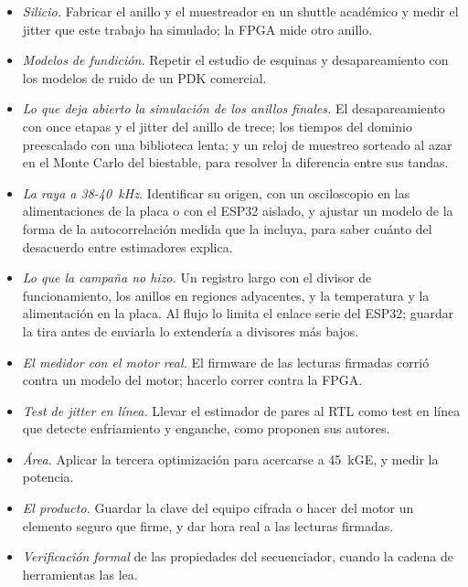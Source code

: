 \begin{itemize}
\item \emph{Silicio.} Fabricar el anillo y el muestreador en un shuttle
académico y medir el jitter que este trabajo ha simulado; la \ac{FPGA}
mide otro anillo.
\item \emph{Modelos de fundición.} Repetir el estudio de esquinas y
desapareamiento con los modelos de ruido de un \ac{PDK} comercial.
\item \emph{Lo que deja abierto la simulación de los anillos finales.} El
desapareamiento con once etapas y el jitter del anillo de trece; los
tiempos del dominio preescalado con una biblioteca lenta; y un reloj de
muestreo sorteado al azar en el Monte Carlo del biestable, para resolver
la diferencia entre sus tandas.
\item \emph{La raya a 38-40~kHz.} Identificar su origen, con un
osciloscopio en las alimentaciones de la placa o con el ESP32 aislado, y
ajustar un modelo de la forma de la autocorrelación medida que la
incluya, para saber cuánto del desacuerdo entre estimadores explica.
\item \emph{Lo que la campaña no hizo.} Un registro largo con el divisor
de funcionamiento, los anillos en regiones adyacentes, y la temperatura y
la alimentación en la placa. Al flujo lo limita el enlace serie del
ESP32; guardar la tira antes de enviarla lo extendería a divisores más
bajos.
\item \emph{El medidor con el motor real.} El firmware de las lecturas
firmadas corrió contra un modelo del motor; hacerlo correr contra la
\ac{FPGA}.
\item \emph{Test de jitter en línea.} Llevar el estimador de pares al RTL
como test en línea que detecte enfriamiento y enganche, como proponen sus
autores.
\item \emph{Área.} Aplicar la tercera optimización para acercarse a
45~kGE, y medir la potencia.
\item \emph{El producto.} Guardar la clave del equipo cifrada o hacer del
motor un elemento seguro que firme, y dar hora real a las lecturas
firmadas.
\item \emph{Verificación formal} de las propiedades del secuenciador,
cuando la cadena de herramientas las lea.
\end{itemize}
